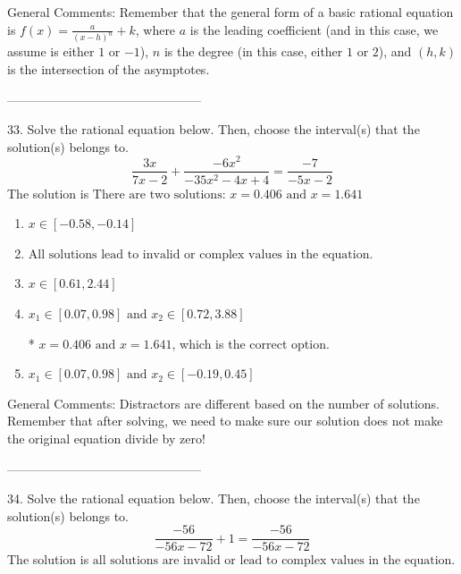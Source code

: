 \documentclass{extbook}[14pt]
\begin{document}
General Comments: Remember that the general form of a basic rational equation is $ f(x) = \frac{a}{(x-h)^n} + k$, where $a$ is the leading coefficient (and in this case, we assume is either $1$ or $-1$), $n$ is the degree (in this case, either $1$ or $2$), and $(h, k)$ is the intersection of the asymptotes.

-----------------------------------------------

33. Solve the rational equation below. Then, choose the interval(s) that the solution(s) belongs to.
\[ \frac{3x}{7x -2} + \frac{-6x^{2}}{-35x^{2} -4 x + 4} = \frac{-7}{-5x -2} \] 
The solution is $ \text{There are two solutions: } x = 0.406 \text{ and } x = 1.641 $ 

\begin{enumerate}[label=\Alph*.] 
\item $ x \in [-0.58,-0.14] $ 

  
\item $ \text{All solutions lead to invalid or complex values in the equation.} $ 

  
\item $ x \in [0.61,2.44] $ 

  
\item $ x_1 \in [0.07, 0.98] \text{ and } x_2 \in [0.72,3.88] $ 

 * $x = 0.406 \text{ and } x = 1.641$, which is the correct option. 
\item $ x_1 \in [0.07, 0.98] \text{ and } x_2 \in [-0.19,0.45] $ 

  
\end{enumerate} 
 
General Comments: Distractors are different based on the number of solutions. Remember that after solving, we need to make sure our solution does not make the original equation divide by zero!

-----------------------------------------------

34. Solve the rational equation below. Then, choose the interval(s) that the solution(s) belongs to.
\[ \frac{-56}{-56x -72} + 1 = \frac{-56}{-56x -72} \] 
The solution is $ \text{all solutions are invalid or lead to complex values in the equation.} $ 
\end{document}
